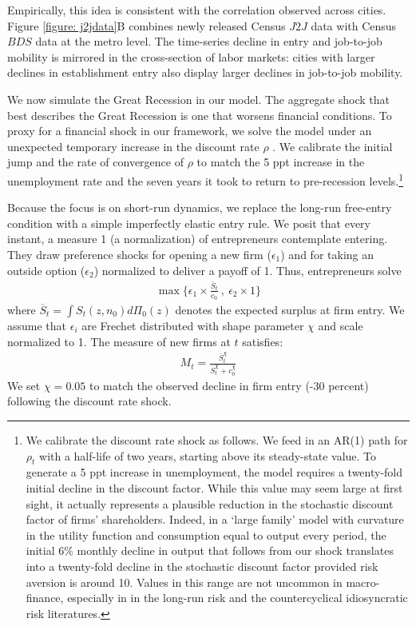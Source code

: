 Empirically, this idea is consistent with the correlation observed across cities.
Figure \ref{figure: j2jdata}B combines newly released Census $J2J$ data with Census $BDS$ data at the metro level.
The time-series decline in entry and job-to-job mobility is mirrored in the cross-section of labor markets: cities with larger declines in establishment entry also display larger declines in job-to-job mobility.

We now simulate the Great Recession in our model.
The aggregate shock that best describes the Great Recession is one that worsens financial conditions.
To proxy for a financial shock in our framework, we solve the model under an unexpected temporary increase in the discount rate $\rho$ \citep[as in][]{hall2017high}.
We calibrate the initial jump and the rate of convergence of $\rho$ to match the 5 ppt increase in the unemployment rate and the seven years it took to return to pre-recession levels.\footnote{We calibrate the discount rate shock as follows. We feed in an AR(1) path for $\rho_t$ with a half-life of two years, starting above its steady-state value. To generate a 5 ppt increase in unemployment, the model requires a twenty-fold initial decline in the discount factor. While this value may seem large at first sight, it actually represents a plausible reduction in the stochastic discount factor of firms' shareholders. Indeed, in a `large family' model with curvature in the utility function and consumption equal to output every period, the initial 6\% monthly decline in output that follows from our shock translates into a twenty-fold decline in the stochastic discount factor provided risk aversion is around 10. Values in this range are not uncommon in macro-finance, especially in in the long-run risk \citep{bansal2004risks} and the countercyclical idiosyncratic risk \citep{constantinides2017asset} literatures.}

Because the focus is on short-run dynamics, we replace the long-run free-entry condition with a simple imperfectly elastic entry rule. We posit that every instant, a measure 1 (a normalization) of entrepreneurs contemplate entering. They draw preference shocks for opening a new firm ($\epsilon_1$) and for taking an outside option ($\epsilon_2$) normalized to deliver a payoff of 1. Thus, entrepreneurs solve
\begin{align*}
\max \Big\{ \epsilon_1 \times \frac{\overline{S}_t}{c_0} \ , \ \epsilon_2 \times 1 \Big\}
\end{align*}
where $\overline{S}_t = \int S_t(z,n_0) d\Pi_0(z)$ denotes the expected surplus at firm entry. We assume that $\epsilon_i$ are Frechet distributed with shape parameter $\chi$ and scale normalized to 1. The measure of new firms at $t$ satisfies:
\begin{align*}
M_t = \frac{\bar{S}_t^\chi}{\bar{S}_t^\chi + c_0^\chi}
\end{align*}
We set {$\chi = 0.05$} to match the observed decline in firm entry (-30 percent) following the discount rate shock.

